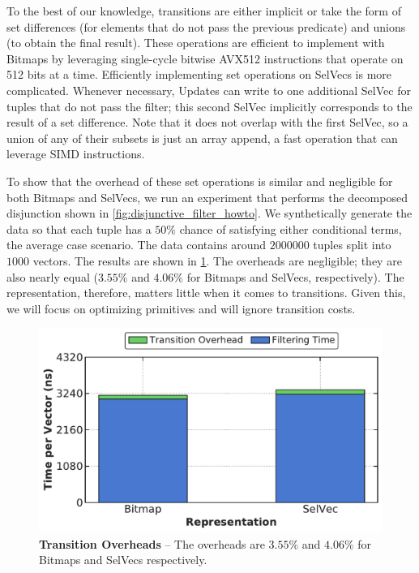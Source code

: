 \documentclass[12pt]{cmuthesis}
\begin{document}
To the best of our knowledge, transitions are either implicit or take the form of set differences (for elements that do not pass the previous predicate) and unions (to obtain the final result). These operations are efficient to implement with Bitmaps by leveraging single-cycle bitwise AVX512 instructions \cite{intel2019} that operate on 512 bits at a time. Efficiently implementing set operations on SelVecs is more complicated.  Whenever necessary, Updates can write to one additional SelVec for tuples that do not pass the filter; this second SelVec implicitly corresponds to the result of a set difference. Note that it does not overlap with the first SelVec, so a union of any of their subsets is just an array append, a fast operation that can leverage SIMD instructions. 

To show that the overhead of these set operations is similar and negligible for both Bitmaps and SelVecs, we run an experiment that performs the decomposed disjunction shown in \cref{fig:disjunctive_filter_howto}. We synthetically generate the data so that each tuple has a $50\%$ chance of satisfying either conditional terms, the average case scenario. The data contains around $2000000$ tuples split into $1000$ vectors. The results are shown in \cref{fig:disjunctive_filter_perf}. The overheads are negligible; they are also nearly equal ($3.55\%$ and $4.06\%$ for Bitmaps and SelVecs, respectively). The representation, therefore, matters little when it comes to transitions. Given this, we will focus on optimizing primitives and will ignore transition costs.

\begin{figure}[t!]
    \centering
    \includegraphics[scale=0.5]{eval/transition.pdf}
    \caption{\textbf{Transition Overheads} -- The overheads are $3.55\%$ and $4.06\%$ for Bitmaps and SelVecs respectively.}
    \label{fig:disjunctive_filter_perf}
\end{figure}
\end{document}
